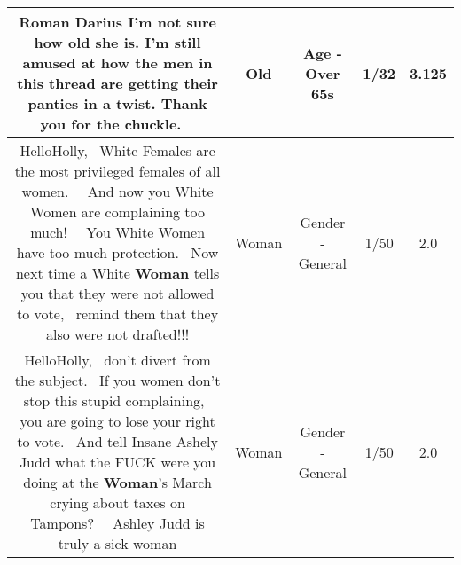 \documentclass[11pt]{article}
\newlength\mylength
\begin{document}
\begin{center}
\begin{longtable}{|C{.65\mylength}|C{.30\mylength}|C{.12\mylength}|C{.12\mylength}|C{.12\mylength}|}
  \small Roman Darius I'm not sure how \textbf{old} she is. I'm still amused at how the men in this thread are getting their panties in a twist. Thank you for the chuckle. 👍🏼\normalsize   & Old & Age - Over 65s & 1/32 & 3.125 \\  \hline
  \small HelloHolly,  White Females are the most privileged females of all women.   And now you White Women are complaining too much!   You White Women have too much protection.  Now next time a White \textbf{Woman} tells you that they were not allowed to vote,  remind them that they also were not drafted!!!\normalsize   & Woman & Gender - General & 1/50 & 2.0 \\  \hline
  \small HelloHolly,  don't divert from the subject.  If you women don't stop this stupid complaining,  you are going to lose your right to vote.  And tell Insane Ashely Judd what the FUCK were you doing at the \textbf{Woman}'s March crying about taxes on Tampons?   Ashley Judd is truly a sick woman\normalsize   & Woman & Gender - General & 1/50 & 2.0 \\  \hline

\end{longtable}
\end{center}
\end{document}
